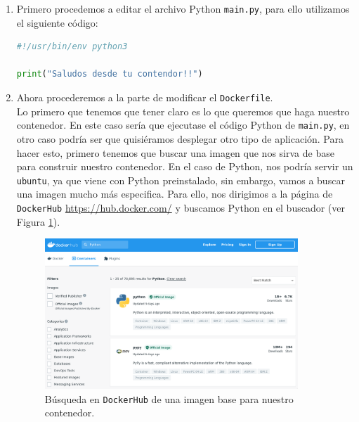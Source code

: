 \documentclass[a4paper, oneside, 12pt]{book}
\begin{document}
	\begin{enumerate}
		\item Primero procedemos a editar el archivo Python \texttt{main.py}, para ello utilizamos el siguiente código:
		\begin{lstlisting}[language=Python, caption=Codigo Python de ejemplo para crear un Dockerfile]
#!/usr/bin/env python3

print("Saludos desde tu contendor!!")
		\end{lstlisting}
	
		\item Ahora procederemos a la parte de modificar el \texttt{Dockerfile}. \\
		
		\noindent Lo primero que tenemos que tener claro es lo que queremos que haga nuestro contenedor. En este caso sería que ejecutase el código Python de \texttt{main.py}, en otro caso podría ser que quisiéramos desplegar otro tipo de aplicación. Para hacer esto, primero tenemos que buscar una imagen que nos sirva de base para construir nuestro contenedor. En el caso de Python, nos podría servir un \texttt{ubuntu}, ya que viene con Python preinstalado, sin embargo, vamos a buscar una imagen mucho más especifica. Para ello, nos dirigimos a la página de \texttt{DockerHub} \url{https://hub.docker.com/} y buscamos Python en el buscador (ver Figura \ref{img: dockerhub python}).
	
	\pagebreak
	
	\begin{figure}[h]
		\begin{center}
			\includegraphics[width=0.9\textwidth]{img/dockerhub_python.png}
			\caption{Búsqueda en \texttt{DockerHub} de una imagen base para nuestro contenedor.}
			\label{img: dockerhub python}
		\end{center}
	\end{figure}
	

\end{enumerate}
\end{document}
